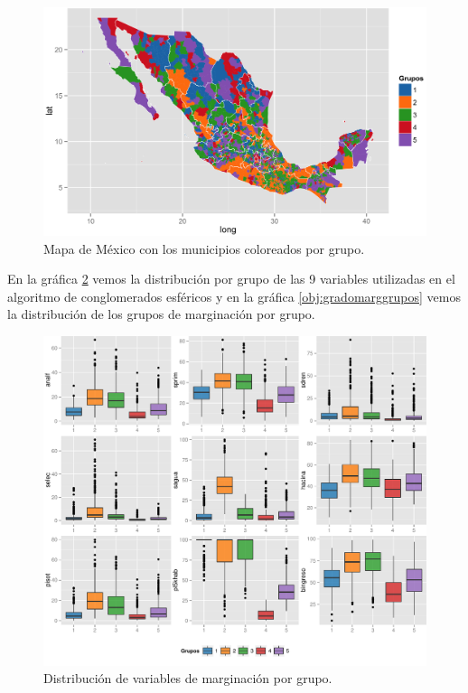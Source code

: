 \begin{landscape}
  \begin{figure}[!ht]
    \centering
    \caption[skip=0pt]{Mapa de México con los municipios coloreados por grupo. \label{mapgroupsmarg} }
    \includegraphics[width=1.4\textheight]{./maps/map5g.png}
  \end{figure}
\end{landscape}

En la gráfica \ref{obj:boxplotgroup} vemos la distribución por grupo de las 9 variables utilizadas en el algoritmo de conglomerados esféricos y en la gráfica \ref{obj:gradomarggrupos} vemos la distribución de los grupos de marginación por grupo.

\begin{figure}[!ht]
  \centering
  \includegraphics[width=\textwidth]{./plots/boxplot_bygroup.pdf}
  \caption{Distribución de variables de marginación por grupo. \label{obj:boxplotgroup} }
\end{figure}



